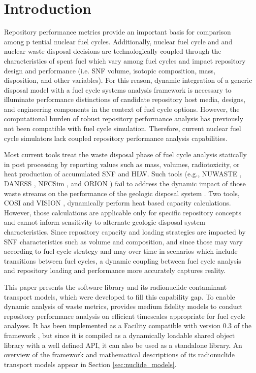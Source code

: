 \section{Introduction}\label{sec:introduction}
Repository performance metrics provide an important basis for comparison among
p tential nuclear fuel cycles.
Additionally, nuclear fuel cycle and and nuclear waste disposal decisions are
technologically coupled through the characteristics of spent fuel which vary among fuel cycles and impact repository design and performance (i.e. \gls{SNF} volume, isotopic composition, mass, disposition, and other variables). 
For this reason, dynamic integration of a generic disposal model with a fuel 
cycle systems analysis framework is necessary to illuminate performance 
distinctions of candidate repository host media, designs, and engineering 
components in the context of fuel cycle options. 
However, the computational
burden of robust repository performance analysis has previously not been
compatible with fuel cycle simulation.
Therefore, current nuclear fuel cycle simulators
lack coupled repository performance analysis capabilities.

Most current tools treat the waste disposal
phase of fuel cycle analysis statically in post processing by reporting
values such as mass, volumes, radiotoxicity, or heat production of accumulated
\gls{SNF} and \gls{HLW}. Such tools
(e.g.,
\gls{NUWASTE} \cite{abkowitz_nuclear_2011},
\gls{DANESS} \cite{van_den_durpel_daness:_2006},
\gls{NFCSim} \cite{schneider_nfcsim_2004}, and
ORION \cite{gregg_orion_2011})
fail to address the dynamic impact of those waste streams on the performance of the
geologic disposal system \cite{wilson_comparing_2011}.  Two tools, \gls{COSI}
\cite{boucher_international_2010} and \gls{VISION} \cite{yacout_vision_2006,
wilson_comparing_2011, radel_repository_2007, boucher_international_2010},
dynamically perform heat based capacity calculations. 
However, those calculations are applicable only for specific
repository concepts and cannot inform sensitivity to alternate geologic disposal
system characteristics.
Since repository capacity and loading strategies are impacted by \gls{SNF} 
characteristics such as volume and composition, and since those may vary 
according to fuel cycle strategy and may over time in scenarios which 
include transitions between fuel cycles, a dynamic coupling between fuel cycle 
analysis and repository loading and performance more accurately captures reality.

This paper presents the \Cyder software library \cite{huff_cyder_2013} and its radionuclide
contaminant transport models, which were  developed to fill this capability gap.  To
enable dynamic analysis of waste metrics, \Cyder provides medium fidelity
models to conduct repository performance analysis on efficient timescales
appropriate for fuel cycle analyses. It has been implemented as a Facility
compatible with version 0.3 of the \Cyclus framework
\cite{wilson_cyclus:_2012}, but since it is compiled as a dynamically loadable 
shared object library with a well defined \gls{API}, it can also be used as a standalone library. An
overview of the \Cyder framework and mathematical descriptions of its
radionuclide transport models appear in Section \ref{sec:nuclide_models}.

